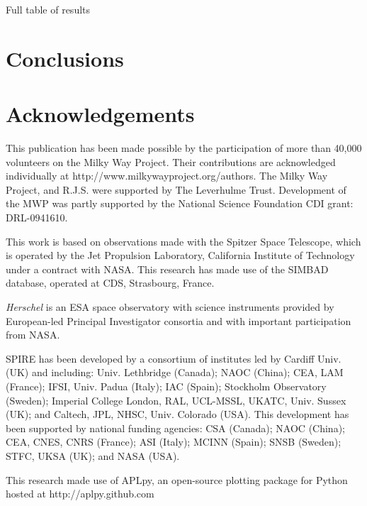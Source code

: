 \documentclass[a4,useAMS,usenatbib]{mn2e}
\begin{document}
Full table of results

\section{Conclusions}


\section{Acknowledgements}
This publication has been made possible by the participation of more than 40,000 volunteers on the Milky Way Project. Their contributions are acknowledged individually at http://www.milkywayproject.org/authors. The Milky Way Project, and R.J.S. were supported by The Leverhulme Trust. Development of the MWP was partly supported by the National Science Foundation CDI grant: DRL-0941610. 

This work is based on observations made with the Spitzer Space Telescope, which is operated by the Jet Propulsion Laboratory, California Institute of Technology under a contract with NASA. This research has made use of the SIMBAD database, operated at CDS, Strasbourg, France.

{\em Herschel} is an ESA space observatory with science instruments
provided by European-led Principal Investigator consortia and with important
participation from NASA.

SPIRE has been developed by a consortium of institutes led by Cardiff
Univ. (UK) and including: Univ. Lethbridge (Canada); NAOC (China);
CEA, LAM (France); IFSI, Univ. Padua (Italy); IAC (Spain); Stockholm
Observatory (Sweden); Imperial College London, RAL, UCL-MSSL, UKATC,
Univ. Sussex (UK); and Caltech, JPL, NHSC, Univ. Colorado (USA). This
development has been supported by national funding agencies: CSA
(Canada); NAOC (China); CEA, CNES, CNRS (France); ASI (Italy); MCINN
(Spain); SNSB (Sweden); STFC, UKSA (UK); and NASA (USA).

This research made use of APLpy, an open-source plotting package for
Python hosted at http://aplpy.github.com
\end{document}
